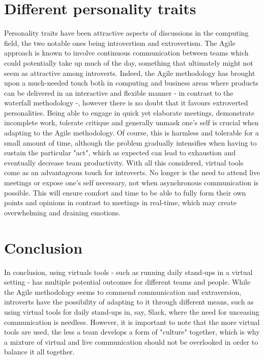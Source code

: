 \documentclass{scrartcl}
\begin{document}
\section{Different personality traits}
Personality traits have been attractive aspects of discussions in the computing field, the two notable ones being introvertism and extrovertism. The Agile approach is known to involve continuous communication between teams which could potentially take up much of the day, something that ultimately might not seem as attractive among introverts. Indeed, the Agile methodology has brought upon a much-needed touch both in computing and business areas where products can be delivered in an interactive and flexible manner - in contrast to the waterfall methodology -, however there is no doubt that it favours extroverted personalities. Being able to engage in quick yet elaborate meetings, demonstrate incomplete work, tolerate critique and generally unmask one's self is crucial when adapting to the Agile methodology. Of course, this is harmless and tolerable for a small amount of time, although the problem gradually intensifies when having to sustain the particular "act", which as expected can lead to exhaustion and eventually decrease team productivity. With all this considered, virtual tools come as an advantageous touch for introverts. No longer is the need to attend live meetings or expose one's self necessary, not when asynchronous communication is possible. This will ensure comfort and time to be able to fully form their own points and opinions in contrast to meetings in real-time, which may create overwhelming and draining emotions. 

\section{Conclusion}
In conclusion, using virtuals tools - such as running daily stand-ups in a virtual setting - has multiple potential outcomes for different teams and people. While the Agile methodology seems to commend communication and extraversion, introverts have the possibility of adapting to it through different means, such as using virtual tools for daily stand-ups in, say, Slack, where the need for unceasing communication is needless. However, it is important to note that the more virtual tools are used, the less a team develops a form of "culture" together, which is why a mixture of virtual and live communication should not be overlooked in order to balance it all together.



\end{document}

